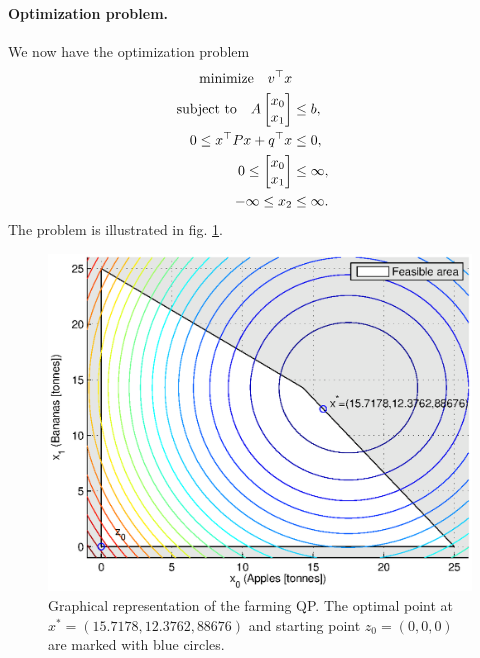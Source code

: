 \paragraph{Optimization problem.} We now have the optimization problem
\begin{subequations}
\begin{align}
\mathrm{minimize} \ \ \  v^\top x \\
\mathrm{subject\ to} \ \ \  A \begin{bmatrix} x_0 \\ x_1 \end{bmatrix} &\leq b, \\
0 \leq x^\top P x + q^\top x &\leq 0, \\
0 \leq \begin{bmatrix} x_0 \\ x_1 \end{bmatrix} &\leq \infty, \\
-\infty \leq x_2 &\leq \infty.
\end{align}
\end{subequations}
The problem is illustrated in fig. \ref{fig:farmingQP}.

\begin{figure}[H]
\centering
\includegraphics[width=\textwidth]{figures/FarmingQP.eps}
\caption{Graphical representation of the farming QP. The optimal point at $x^*=(15.7178,12.3762,88676)$ and starting point $z_0 = (0,0,0)$ are marked with blue circles.}
\label{fig:farmingQP}
\end{figure}

